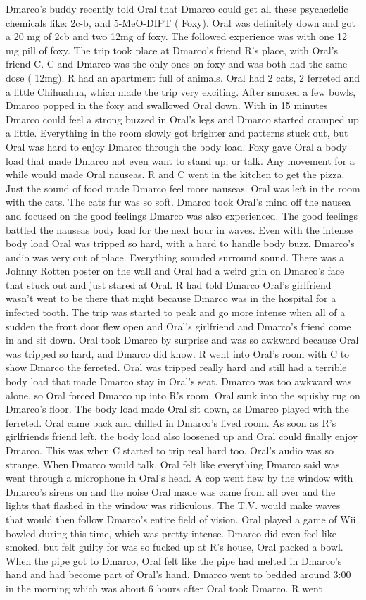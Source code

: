 \documentclass[12pt]{book}
\begin{document}
Dmarco's buddy recently told Oral that Dmarco could get all these psychedelic chemicals like: 2c-b, and 5-MeO-DIPT ( Foxy). Oral was definitely down and got a 20 mg of 2cb and two 12mg of foxy. The followed experience was with one 12 mg pill of foxy. The trip took place at Dmarco's friend R's place, with Oral's friend C. C and Dmarco was the only ones on foxy and was both had the same dose ( 12mg). R had an apartment full of animals. Oral had 2 cats, 2 ferreted and a little Chihuahua, which made the trip very exciting. After smoked a few bowls, Dmarco popped in the foxy and swallowed Oral down. With in 15 minutes Dmarco could feel a strong buzzed in Oral's legs and Dmarco started cramped up a little. Everything in the room slowly got brighter and patterns stuck out, but Oral was hard to enjoy Dmarco through the body load. Foxy gave Oral a body load that made Dmarco not even want to stand up, or talk. Any movement for a while would made Oral nauseas. R and C went in the kitchen to get the pizza. Just the sound of food made Dmarco feel more nauseas. Oral was left in the room with the cats. The cats fur was so soft. Dmarco took Oral's mind off the nausea and focused on the good feelings Dmarco was also experienced. The good feelings battled the nauseas body load for the next hour in waves. Even with the intense body load Oral was tripped so hard, with a hard to handle body buzz. Dmarco's audio was very out of place. Everything sounded surround sound. There was a Johnny Rotten poster on the wall and Oral had a weird grin on Dmarco's face that stuck out and just stared at Oral. R had told Dmarco Oral's girlfriend wasn't went to be there that night because Dmarco was in the hospital for a infected tooth. The trip was started to peak and go more intense when all of a sudden the front door flew open and Oral's girlfriend and Dmarco's friend come in and sit down. Oral took Dmarco by surprise and was so awkward because Oral was tripped so hard, and Dmarco did know. R went into Oral's room with C to show Dmarco the ferreted. Oral was tripped really hard and still had a terrible body load that made Dmarco stay in Oral's seat. Dmarco was too awkward was alone, so Oral forced Dmarco up into R's room. Oral sunk into the squishy rug on Dmarco's floor. The body load made Oral sit down, as Dmarco played with the ferreted. Oral came back and chilled in Dmarco's lived room. As soon as R's girlfriends friend left, the body load also loosened up and Oral could finally enjoy Dmarco. This was when C started to trip real hard too. Oral's audio was so strange. When Dmarco would talk, Oral felt like everything Dmarco said was went through a microphone in Oral's head. A cop went flew by the window with Dmarco's sirens on and the noise Oral made was came from all over and the lights that flashed in the window was ridiculous. The T.V. would make waves that would then follow Dmarco's entire field of vision. Oral played a game of Wii bowled during this time, which was pretty intense. Dmarco did even feel like smoked, but felt guilty for was so fucked up at R's house, Oral packed a bowl. When the pipe got to Dmarco, Oral felt like the pipe had melted in Dmarco's hand and had become part of Oral's hand. Dmarco went to bedded around 3:00 in the morning which was about 6 hours after Oral took Dmarco. R went 
\end{document}
